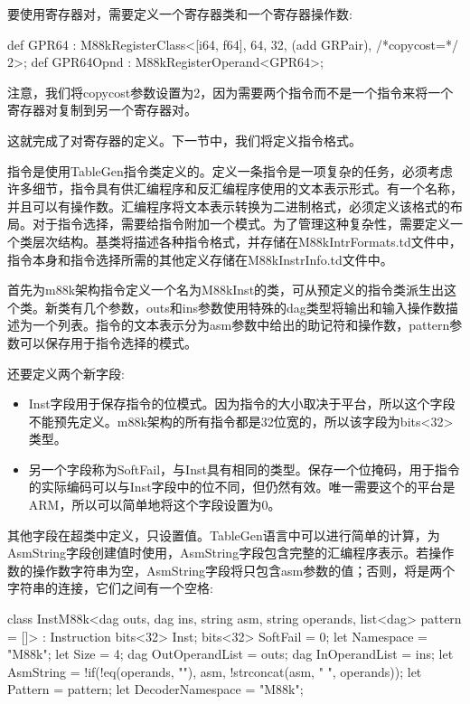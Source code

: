 要使用寄存器对，需要定义一个寄存器类和一个寄存器操作数:

\begin{cpp}
def GPR64 : M88kRegisterClass<[i64, f64], 64, 32,
                              (add GRPair), /*copycost=*/ 2>;
def GPR64Opnd : M88kRegisterOperand<GPR64>;
\end{cpp}

注意，我们将copycost参数设置为2，因为需要两个指令而不是一个指令来将一个寄存器对复制到另一个寄存器对。

这就完成了对寄存器的定义。下一节中，我们将定义指令格式。


指令是使用TableGen指令类定义的。定义一条指令是一项复杂的任务，必须考虑许多细节，指令具有供汇编程序和反汇编程序使用的文本表示形式。有一个名称，并且可以有操作数。汇编程序将文本表示转换为二进制格式，必须定义该格式的布局。对于指令选择，需要给指令附加一个模式。为了管理这种复杂性，需要定义一个类层次结构。基类将描述各种指令格式，并存储在M88kIntrFormats.td文件中，指令本身和指令选择所需的其他定义存储在M88kInstrInfo.td文件中。

首先为m88k架构指令定义一个名为M88kInst的类，可从预定义的指令类派生出这个类。新类有几个参数，outs和ins参数使用特殊的dag类型将输出和输入操作数描述为一个列表。指令的文本表示分为asm参数中给出的助记符和操作数，pattern参数可以保存用于指令选择的模式。

还要定义两个新字段:

\begin{itemize}
\item
Inst字段用于保存指令的位模式。因为指令的大小取决于平台，所以这个字段不能预先定义。m88k架构的所有指令都是32位宽的，所以该字段为bits<32>类型。

\item
另一个字段称为SoftFail，与Inst具有相同的类型。保存一个位掩码，用于指令的实际编码可以与Inst字段中的位不同，但仍然有效。唯一需要这个的平台是ARM，所以可以简单地将这个字段设置为0。
\end{itemize}

其他字段在超类中定义，只设置值。TableGen语言中可以进行简单的计算，为AsmString字段创建值时使用，AsmString字段包含完整的汇编程序表示。若操作数的操作数字符串为空，AsmString字段将只包含asm参数的值；否则，将是两个字符串的连接，它们之间有一个空格:

\begin{cpp}
class InstM88k<dag outs, dag ins, string asm, string operands,
                list<dag> pattern = []>
    : Instruction {
    bits<32> Inst;
    bits<32> SoftFail = 0;
    let Namespace = "M88k";
    let Size = 4;
    dag OutOperandList = outs;
    dag InOperandList = ins;
    let AsmString = !if(!eq(operands, ""), asm,
                        !strconcat(asm, " ", operands));
    let Pattern = pattern;
    let DecoderNamespace = "M88k";
}
\end{cpp}

